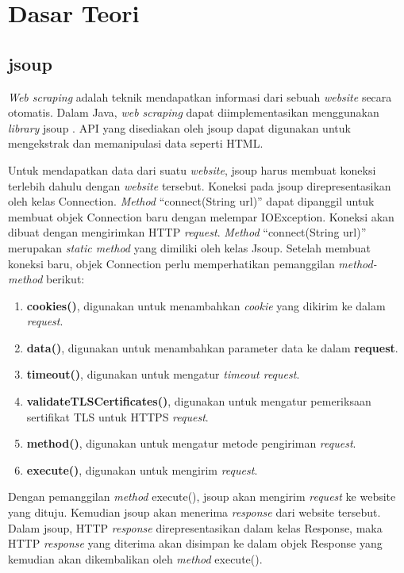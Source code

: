 \chapter{Dasar Teori}
\label{chap:Dasar Teori}

\section{jsoup}
\label{sec:jsoup}

\textit{Web scraping} adalah teknik mendapatkan informasi dari sebuah \textit{website} secara otomatis. Dalam Java, \textit{web scraping} dapat diimplementasikan menggunakan \textit{library} jsoup \cite{jsoup}. API yang disediakan oleh jsoup dapat digunakan untuk mengekstrak dan memanipulasi data seperti HTML. 

Untuk mendapatkan data dari suatu \textit{website}, jsoup harus membuat koneksi terlebih dahulu dengan \textit{website} tersebut. Koneksi pada jsoup direpresentasikan oleh kelas Connection. \textit{Method} "`connect(String url)"' dapat dipanggil untuk membuat objek Connection baru dengan melempar IOException. Koneksi akan dibuat dengan mengirimkan HTTP \textit{request}. \textit{Method} "`connect(String url)"' merupakan \textit{static method} yang dimiliki oleh kelas Jsoup. Setelah membuat koneksi baru, objek Connection perlu memperhatikan pemanggilan \textit{method-method} berikut:
\begin{enumerate}
	\item \textbf{cookies()}, digunakan untuk menambahkan \textit{cookie} yang dikirim ke dalam \textit{request}.
	\item \textbf{data()}, digunakan untuk menambahkan parameter data ke dalam \textbf{request}.
	\item \textbf{timeout()}, digunakan untuk mengatur \textit{timeout request}.
	\item \textbf{validateTLSCertificates()}, digunakan untuk mengatur pemeriksaan sertifikat TLS untuk HTTPS \textit{request}. 
	\item \textbf{method()}, digunakan untuk mengatur metode pengiriman \textit{request}. 
	\item \textbf{execute()}, digunakan untuk mengirim \textit{request}. 
\end{enumerate}

Dengan pemanggilan \textit{method} execute(), jsoup akan mengirim \textit{request} ke website yang dituju. Kemudian jsoup akan menerima \textit{response} dari website tersebut. Dalam jsoup, HTTP \textit{response} direpresentasikan dalam kelas Response, maka HTTP \textit{response} yang diterima akan disimpan ke dalam objek Response yang kemudian akan dikembalikan oleh \textit{method} execute().

